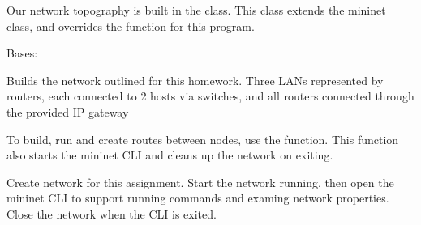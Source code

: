 \documentclass[letterpaper,10pt,english,openany,oneside]{sphinxmanual}
\begin{document}
\sphinxAtStartPar
Our network topography is built in the  class. This class extends
the mininet  class, and overrides the  function
for this program.

\begin{fulllineitems}
\label{\detokenize{index:layer3_network_code.NetworkTopo}}
\pysigstartsignatures
\pysigline
{}
\pysigstopsignatures
\sphinxAtStartPar
Bases: 

\begin{fulllineitems}
\label{\detokenize{index:layer3_network_code.NetworkTopo.build}}
\pysigstartsignatures
\pysiglinewithargsret
{}
{}
{}
\pysigstopsignatures
\sphinxAtStartPar
Builds the network outlined for this homework. Three LANs represented by routers, each connected to
2 hosts via switches, and all routers connected through the provided IP gateway

\end{fulllineitems}


\end{fulllineitems}


\sphinxAtStartPar
To build, run and create routes between nodes, use the  function. This
function also starts the mininet CLI and cleans up the network on exiting.

\begin{fulllineitems}
\label{\detokenize{index:layer3_network_code.run}}
\pysigstartsignatures
\pysiglinewithargsret
{}
{}
{}
\pysigstopsignatures
\sphinxAtStartPar
Create network for this assignment. Start the network running, then open the mininet CLI to support
running commands and examing network properties. Close the network when the CLI is exited.

\end{fulllineitems}




\renewcommand{\indexname}{Index}
\printindex
\end{document}
